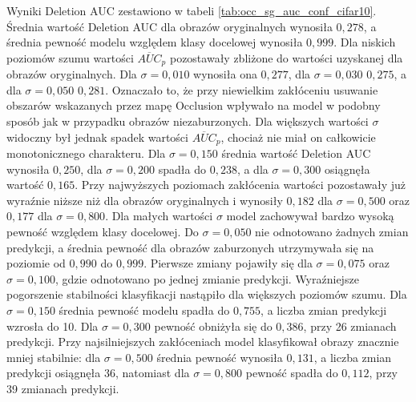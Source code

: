 Wyniki Deletion AUC zestawiono w tabeli \ref{tab:occ_sg_auc_conf_cifar10}. Średnia wartość Deletion AUC dla obrazów oryginalnych wynosiła $0{,}278$, a średnia pewność modelu względem klasy docelowej wynosiła $0{,}999$.
Dla niskich poziomów szumu wartości $\overline{AUC}_{p}$ pozostawały zbliżone do wartości uzyskanej dla obrazów oryginalnych. Dla $\sigma = 0{,}010$ wynosiła ona $0{,}277$, dla $\sigma = 0{,}030$ $0{,}275$, a dla $\sigma = 0{,}050$ $0{,}281$. Oznaczało to, że przy niewielkim zakłóceniu usuwanie obszarów wskazanych przez mapę Occlusion wpływało na model w podobny sposób jak w przypadku obrazów niezaburzonych.
Dla większych wartości $\sigma$ widoczny był jednak spadek wartości $\overline{AUC}_{p}$, chociaż nie miał on całkowicie monotonicznego charakteru. Dla $\sigma = 0{,}150$ średnia wartość Deletion AUC wynosiła $0{,}250$, dla $\sigma = 0{,}200$ spadła do $0{,}238$, a dla $\sigma = 0{,}300$ osiągnęła wartość $0{,}165$. Przy najwyższych poziomach zakłócenia wartości pozostawały już wyraźnie niższe niż dla obrazów oryginalnych i wynosiły $0{,}182$ dla $\sigma = 0{,}500$ oraz $0{,}177$ dla $\sigma = 0{,}800$. Dla małych wartości $\sigma$ model zachowywał bardzo wysoką pewność względem klasy docelowej. Do $\sigma = 0{,}050$ nie odnotowano żadnych zmian predykcji, a średnia pewność dla obrazów zaburzonych utrzymywała się na poziomie od $0{,}990$ do $0{,}999$. Pierwsze zmiany pojawiły się dla $\sigma = 0{,}075$ oraz $\sigma = 0{,}100$, gdzie odnotowano po jednej zmianie predykcji.
Wyraźniejsze pogorszenie stabilności klasyfikacji nastąpiło dla większych poziomów szumu. Dla $\sigma = 0{,}150$ średnia pewność modelu spadła do $0{,}755$, a liczba zmian predykcji wzrosła do 10. Dla $\sigma = 0{,}300$ pewność obniżyła się do $0{,}386$, przy 26 zmianach predykcji. Przy najsilniejszych zakłóceniach model klasyfikował obrazy znacznie mniej stabilnie: dla $\sigma = 0{,}500$ średnia pewność wynosiła $0{,}131$, a liczba zmian predykcji osiągnęła 36, natomiast dla $\sigma = 0{,}800$ pewność spadła do $0{,}112$, przy 39 zmianach predykcji.

